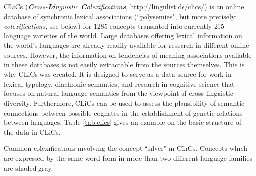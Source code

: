 CLiCs (\emph{\textbf{C}ross-\textbf{Li}nguistic \textbf{C}olexification\textbf{s}},
\url{http://lingulist.de/clics/}) is an online
database of synchronic lexical associations (``polysemies", but more precisely:
\emph{colexifications}, see below) for 1285 concepts translated into currently 215 language varieties of the world. 
Large databases offering lexical
information on the world's languages are already readily available for research in different online
sources. However, the information on tendencies of meaning associations available in these databases
is not easily extractable from the sources themselves. This is why CLiCs was created.  
It is designed
to serve as a data source for work in lexical typology, diachronic semantics, and research in
cognitive science that focuses on natural language semantics from the viewpoint of cross-linguistic
diversity. Furthermore, CLiCs can be used to assess the plausibility of semantic
connections between possible cognates in the establishment of genetic relations between languages.
Table \ref{tab:clics} gives an example on the basic structure of the data in CLiCs. 
 
\begin{table}[b]
    \centering
{}
\caption{Common colexifications involving the concept ``silver" in CLiCs. Concepts which are
expressed by the same word form in more than two different language families are shaded gray.}
\label{tab:clics}
\end{table}

